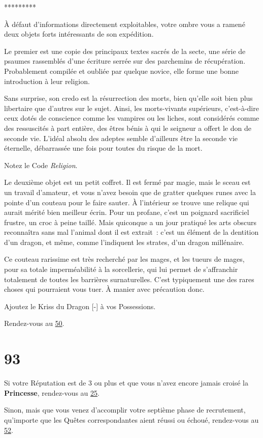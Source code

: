 \documentclass{report}
\newcommand{\gsection}[1]{
    \section{#1}
    \label{section-#1}
}
\newcommand{\glink}[1]{\hyperref[section-#1]{#1}}
\newcommand{\ellipse}{
    \begin{center}
        *********
    \end{center}
}
\newcommand{\hero}[1]{\textbf{#1}}
\begin{document}
\ellipse

À défaut d'informations directement exploitables, votre ombre vous a ramené deux objets forts intéressants de son expédition.

Le premier est une copie des principaux textes sacrés de la secte, une série de psaumes rassemblés d'une écriture serrée sur des parchemins de récupération. Probablement compilée et oubliée par quelque novice, elle forme une bonne introduction à leur religion.

Sans surprise, son credo est la résurrection des morts, bien qu'elle soit bien plus libertaire que d'autres sur le sujet. Ainsi, les morts-vivants supérieurs, c'est-à-dire ceux dotés de conscience comme les vampires ou les liches, sont considérés comme des ressuscités à part entière, des êtres bénis à qui le seigneur a offert le don de seconde vie. L'idéal absolu des adeptes semble d'ailleurs être la seconde vie éternelle, débarrassée une fois pour toutes du risque de la mort.

Notez le Code \emph{Religion}.

Le deuxième objet est un petit coffret. Il est fermé par magie, mais le sceau est un travail d'amateur, et vous n'avez besoin que de gratter quelques runes avec la pointe d'un couteau pour le faire sauter. À l'intérieur se trouve une relique qui aurait mérité bien meilleur écrin. Pour un profane, c'est un poignard sacrificiel frustre, un croc à peine taillé. Mais quiconque a un jour pratiqué les arts obscurs reconnaîtra sans mal l'animal dont il est extrait : c'est un élément de la dentition d'un dragon, et même, comme l'indiquent les strates, d'un dragon millénaire.

Ce couteau rarissime est très recherché par les mages, et les tueurs de mages, pour sa totale imperméabilité à la sorcellerie, qui lui permet de s'affranchir totalement de toutes les barrières surnaturelles. C'est typiquement une des rares choses qui pourraient vous tuer. À manier avec précaution donc.

Ajoutez le Kriss du Dragon [-] à vos Possessions.

Rendez-vous au \glink{50}.

\gsection{93}

Si votre Réputation est de 3 ou plus et que vous n'avez encore jamais croisé la \hero{Princesse}, rendez-vous au \glink{25}.

Sinon, mais que vous venez d'accomplir votre septième phase de recrutement, qu'importe que les Quêtes correspondantes aient réussi ou échoué, rendez-vous au \glink{52}.
\end{document}
